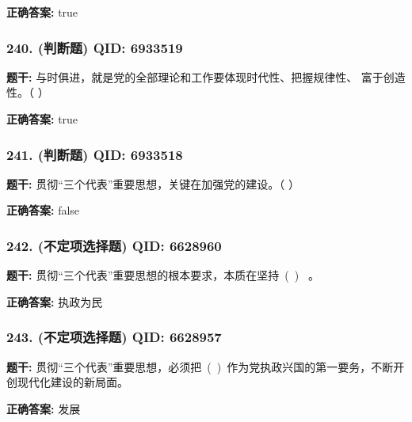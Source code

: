 \documentclass[12pt,UTF8]{ctexart}
\begin{document}
\textbf{正确答案:}
true

\vspace{0.3em}\hrulefill\vspace{0.7em}

\subsubsection*{240. (判断题) \small QID: 6933519}

\textbf{题干:}
与时俱进，就是党的全部理论和工作要体现时代性、把握规律性、 富于创造性。（ ）

\textbf{正确答案:}
true

\vspace{0.3em}\hrulefill\vspace{0.7em}

\subsubsection*{241. (判断题) \small QID: 6933518}

\textbf{题干:}
贯彻“三个代表”重要思想，关键在加强党的建设。（ ）

\textbf{正确答案:}
false

\vspace{0.3em}\hrulefill\vspace{0.7em}

\subsubsection*{242. (不定项选择题) \small QID: 6628960}

\textbf{题干:}
贯彻“三个代表”重要思想的根本要求，本质在坚持 ( )  。

\textbf{正确答案:}
执政为民

\vspace{0.3em}\hrulefill\vspace{0.7em}

\subsubsection*{243. (不定项选择题) \small QID: 6628957}

\textbf{题干:}
贯彻“三个代表”重要思想，必须把 ( ) 作为党执政兴国的第一要务，不断开创现代化建设的新局面。

\textbf{正确答案:}
发展

\vspace{0.3em}\hrulefill\vspace{0.7em}
\end{document}
